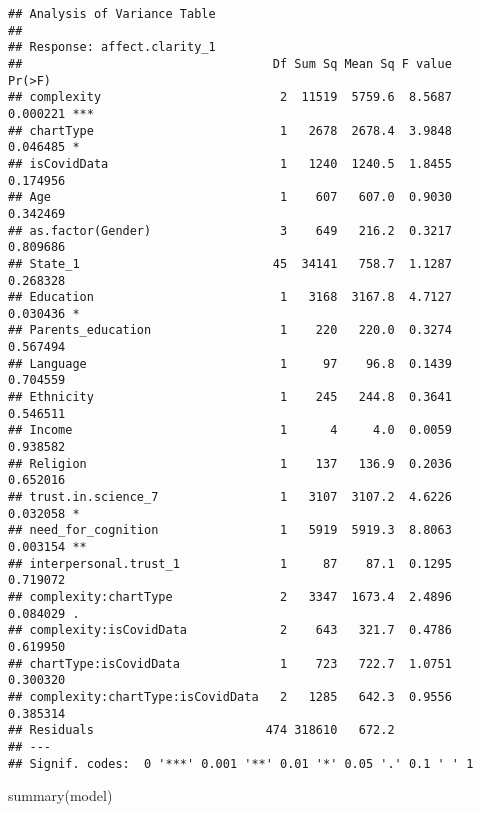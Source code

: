 \documentclass[
]{article}
\newenvironment{Shaded}{\begin{snugshade}}{\end{snugshade}}
\newcommand{\FunctionTok}[1]{\textcolor[rgb]{0.00,0.00,0.00}{#1}}
\newcommand{\NormalTok}[1]{#1}
\begin{document}
\begin{verbatim}
## Analysis of Variance Table
## 
## Response: affect.clarity_1
##                                   Df Sum Sq Mean Sq F value   Pr(>F)    
## complexity                         2  11519  5759.6  8.5687 0.000221 ***
## chartType                          1   2678  2678.4  3.9848 0.046485 *  
## isCovidData                        1   1240  1240.5  1.8455 0.174956    
## Age                                1    607   607.0  0.9030 0.342469    
## as.factor(Gender)                  3    649   216.2  0.3217 0.809686    
## State_1                           45  34141   758.7  1.1287 0.268328    
## Education                          1   3168  3167.8  4.7127 0.030436 *  
## Parents_education                  1    220   220.0  0.3274 0.567494    
## Language                           1     97    96.8  0.1439 0.704559    
## Ethnicity                          1    245   244.8  0.3641 0.546511    
## Income                             1      4     4.0  0.0059 0.938582    
## Religion                           1    137   136.9  0.2036 0.652016    
## trust.in.science_7                 1   3107  3107.2  4.6226 0.032058 *  
## need_for_cognition                 1   5919  5919.3  8.8063 0.003154 ** 
## interpersonal.trust_1              1     87    87.1  0.1295 0.719072    
## complexity:chartType               2   3347  1673.4  2.4896 0.084029 .  
## complexity:isCovidData             2    643   321.7  0.4786 0.619950    
## chartType:isCovidData              1    723   722.7  1.0751 0.300320    
## complexity:chartType:isCovidData   2   1285   642.3  0.9556 0.385314    
## Residuals                        474 318610   672.2                     
## ---
## Signif. codes:  0 '***' 0.001 '**' 0.01 '*' 0.05 '.' 0.1 ' ' 1
\end{verbatim}

\begin{Shaded}
\begin{Highlighting}[]
\FunctionTok{summary}\NormalTok{(model)}
\end{Highlighting}
\end{Shaded}
\end{document}
